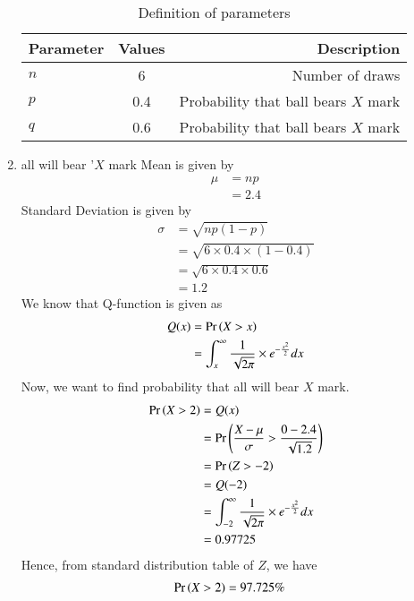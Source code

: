 \documentclass[journal,12pt,twocolumn]{IEEEtran}
\theoremstyle{remark}
\begin{document}
\begin{enumerate}
\begin{table}[!ht]
\centering
\begin{tabular}{|l|c|r|}
    \hline
    Parameter & Values & Description\\
    \hline
    $n$ & 6 & Number of draws\\
    \hline
    $p$ & 0.4 & Probability that ball bears $X$ mark \\
    \hline
    $q$ & 0.6 & Probability that ball bears $X$ mark \\
    \hline
\end{tabular}
\caption{Definition of parameters}
\label{tab:gaussian/9/3/17}
\end{table}
\item all will bear '$X$ mark
Mean is given by
\begin{align}
	\mu &= np \\
	&= 2.4
\end{align}
Standard Deviation is given by
\begin{align}
	\sigma &= \sqrt{np(1 - p)}\\
	&= \sqrt{6 \times 0.4 \times (1 - 0.4)} \\
	&= \sqrt{6 \times 0.4 \times 0.6}\\
	&=  1.2
\end{align}
We know that Q-function is given as
\begin{align}
Q(x) &= \Pr\left(X > x\right)\\
&= \int_{x}^{\infty}\frac{1}{\sqrt{2\pi}}\times e^{-\frac{x^2}{2}}dx
\end{align}
Now, we want to find probability that all will bear $X$ mark.
\begin{align}
\Pr\left(X > 2\right) &=Q(x) \\
&=\Pr\left(\frac{X - \mu}{\sigma} > \frac{0 - 2.4}{\sqrt{1.2}}\right) \\
&= \Pr\left(Z > -2\right) \\
&=  Q(-2)\\
&=  \int_{-2}^{\infty}\frac{1}{\sqrt{2\pi}}\times e^{-\frac{x^2}{2}}dx\\
&= 0.97725
\end{align}
Hence, from standard distribution table of $Z$, we have
\begin{align}
	\Pr\left(X > 2\right) &=97.725\%
\end{align}


\end{enumerate}
\end{document}
